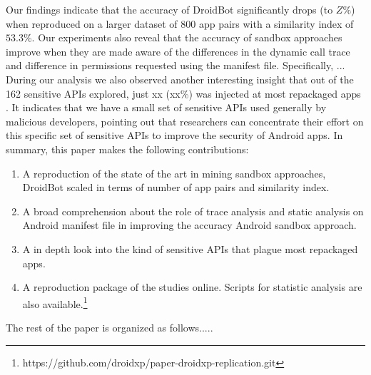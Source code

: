 Our findings indicate that the accuracy of DroidBot significantly drops (to $Z\%$) when reproduced on a larger dataset of $800$ app pairs with a similarity index of $53.3\%$. Our experiments also reveal that the accuracy of sandbox approaches improve when they are made aware of the differences in the dynamic call trace and difference in permissions requested using the manifest file. Specifically, ... 
During our analysis we also observed another interesting insight that out of the 162 sensitive APIs explored, just xx (xx\%) was injected at most repackaged apps . It indicates that we have a small set of sensitive APIs used generally by malicious developers, pointing out that researchers can concentrate their effort on this specific set of sensitive APIs to improve the security of Android apps. 
In summary, this paper makes the following contributions:

\begin{enumerate}[1.]
\item A reproduction of the state of the art in mining sandbox approaches, DroidBot scaled in terms of number of app pairs and similarity index.
\item A broad comprehension about the role of trace analysis and static analysis on Android manifest file in improving the accuracy Android sandbox approach.
\item A in depth look into the kind of sensitive APIs that plague most repackaged apps.
\item A reproduction package of the studies online. Scripts for statistic analysis are also available.\footnote{https://github.com/droidxp/paper-droidxp-replication.git}
\end{enumerate}


The rest of the paper is organized as follows.....




